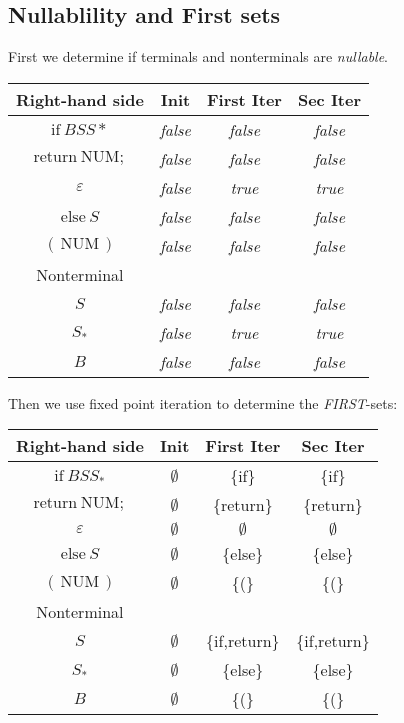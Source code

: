 \documentclass[11pt,a4paper]{article}
\begin{document}
\subsection{Nullablility and First sets}
First we determine if terminals and nonterminals are \emph{nullable}.

\begin{center}
\begin{tabular}{c||c|c|c}
Right-hand side & Init & First Iter & Sec Iter\tabularnewline
\hline 
\hline 
$\mathrm{if\:}BSS*$ & \emph{false} & \emph{false} & \emph{false}\tabularnewline
\hline 
$\mathrm{return\:NUM;}$ & \emph{false} & \emph{false} & \emph{false}\tabularnewline
\hline 
$\varepsilon$ & \emph{false} & \emph{true} & \emph{true}\tabularnewline
\hline 
$\mathrm{else}\:S$ & \emph{false} & \emph{false} & \emph{false}\tabularnewline
\hline 
$\mathrm{(\,NUM\,)}$ & \emph{false} & \emph{false} & \emph{false}\tabularnewline
\hline 
Nonterminal & \multicolumn{1}{c}{} & \multicolumn{1}{c}{} & \tabularnewline
\hline 
$S$ & \emph{false} & \emph{false} & \emph{false}\tabularnewline
\hline 
$S_*$ & \emph{false} & \emph{true} & \emph{true}\tabularnewline
\hline 
$B$ & \emph{false} & \emph{false} & \emph{false}\tabularnewline
\end{tabular}
\end{center}
Then we use fixed point iteration to determine the \emph{FIRST}-sets:
\begin{center}
\begin{tabular}{c||c|c|c}
Right-hand side & Init & First Iter & Sec Iter\tabularnewline
\hline 
\hline 
$\mathrm{if\:}BSS_*$       & $\emptyset$ & \{if\}        & \{if\}        \tabularnewline
\hline                                                                
$\mathrm{return\:NUM;}$ & $\emptyset$ & \{return\}    & \{return\}    \tabularnewline
\hline                                                                
$\varepsilon$           & $\emptyset$ & $\emptyset$   & $\emptyset$   \tabularnewline
\hline                                                                
$\mathrm{else}\:S$      & $\emptyset$ & \{else\}      & \{else\}      \tabularnewline
\hline                                                                
$\mathrm{(\,NUM\,)}$    & $\emptyset$ & \{(\}         & \{(\}         \tabularnewline
\hline 
Nonterminal & \multicolumn{1}{c}{} & \multicolumn{1}{c}{} & \tabularnewline
\hline 
$S$                     & $\emptyset$ & \{if,return\} & \{if,return\} \tabularnewline
\hline                                                                  
$S_*$                   & $\emptyset$ & \{else\}      & \{else\}      \tabularnewline
\hline                                                                 
$B$                     & $\emptyset$ & \{(\}         & \{(\}         \tabularnewline
\end{tabular}               
\end{center}                
\end{document}
